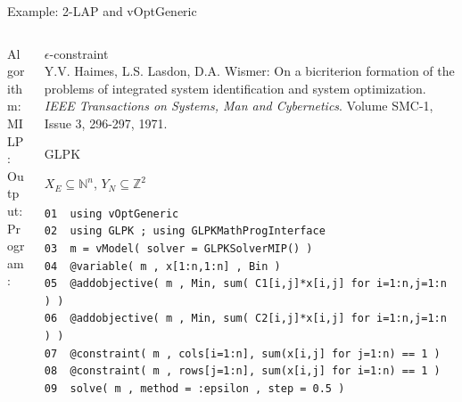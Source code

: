 \documentclass[10pt,xcolor=dvipsnames]{beamer}
\newcommand{\mN}{\mathbb{N}}
\newcommand{\Z}{\mathbb{Z}}
\begin{document}
\begin{frame}[fragile=singleslide]{Example: 2-LAP and vOptGeneric}

\vspace{5mm}
\begin{columns}
%
\begin{column}{0.15\textwidth}
Algorithm: \\
\vspace{18mm}
MILP:\\  
\vspace{2mm}
Output: \\
\vspace{6mm}
Program:
\vspace{30mm}
\end{column}
\begin{column}{0.85\textwidth}
         $\epsilon$-constraint \vspace{1mm}\\
         {\footnotesize Y.V. Haimes, L.S. Lasdon, D.A. Wismer: On a bicriterion formation of the problems of integrated system identification and system optimization. 
         \textit{IEEE Transactions on Systems, Man and Cybernetics}. Volume SMC-1, Issue 3, 296-297, 1971.\\}
\medskip

         GLPK
\medskip

$X_E \subseteq \mN^n$, $Y_N \subseteq \Z^2$
\vspace{3mm}

{\footnotesize
\begin{verbatim}
01  using vOptGeneric
02  using GLPK ; using GLPKMathProgInterface
03  m = vModel( solver = GLPKSolverMIP() )
04  @variable( m , x[1:n,1:n] , Bin )
05  @addobjective( m , Min, sum( C1[i,j]*x[i,j] for i=1:n,j=1:n ) )
06  @addobjective( m , Min, sum( C2[i,j]*x[i,j] for i=1:n,j=1:n ) )
07  @constraint( m , cols[i=1:n], sum(x[i,j] for j=1:n) == 1 )
08  @constraint( m , rows[j=1:n], sum(x[i,j] for i=1:n) == 1 )
09  solve( m , method = :epsilon , step = 0.5 )
\end{verbatim}
}


          
\end{column}
%
\end{columns}         

       
\end{frame}
\end{document}
